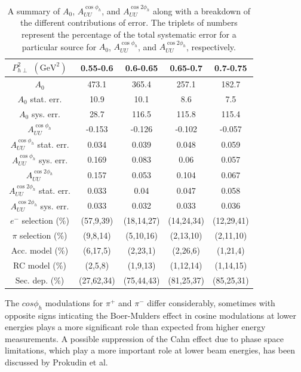 \documentclass[aps,prl,twocolumn,showpacs,superscriptaddress,groupedaddress]{revtex4-1}  %
\begin{document}
%
%
\begin{table}
\begin{center}
\begin{tabular}{ |c||c|c|c|c| } 

  \hline
  $P_{h\perp}^2$ $(\text{GeV}^2)$ & 0.55-0.6 & 0.6-0.65 & 0.65-0.7 & 0.7-0.75 \\
  \hline
  \hline
  $A_0$ & 473.1 & 365.4 & 257.1 & 182.7 \\
  \hline
  $A_0$ stat. err. & 10.9 & 10.1 & 8.6 & 7.5 \\
  \hline
  $A_0$ sys. err. & 28.7 & 116.5 & 115.8 & 115.4 \\
  \hline
  $A_{UU}^{\cos \phi_h}$ & -0.153 & -0.126 & -0.102 & -0.057 \\
  \hline
  $A_{UU}^{\cos \phi_h}$ stat. err. & 0.034 & 0.039 & 0.048 & 0.059 \\
  \hline
  $A_{UU}^{\cos \phi_h}$ sys. err. & 0.169 & 0.083 & 0.06 & 0.057 \\
  \hline
  $A_{UU}^{\cos 2 \phi_h}$ & 0.157 & 0.053 & 0.104 & 0.067 \\
  \hline
  $A_{UU}^{\cos 2 \phi_h}$ stat. err. & 0.033 & 0.04 & 0.047 & 0.058 \\
  \hline
  $A_{UU}^{\cos 2 \phi_h}$ sys. err. & 0.033 & 0.032 & 0.033 & 0.036 \\
  \hline
  $e^-$ selection (\%) & (57,9,39) & (18,14,27) & (14,24,34) & (12,29,41) \\
  \hline
  $\pi$ selection (\%) & (9,8,14) & (5,10,16) & (2,13,10) & (2,11,10) \\
  \hline
  Acc. model (\%) & (6,17,5) & (2,23,1) & (2,26,6) & (1,21,4) \\
  \hline
  RC model (\%) & (2,5,8) & (1,9,13) & (1,12,14) & (1,14,15) \\
  \hline
  Sec. dep. (\%) & (27,62,34) & (75,44,43) & (81,25,37) & (85,25,31) \\
  \hline

\end{tabular}
\end{center}
\caption{A summary of $A_0$, $A_{UU}^{\cos \phi_h}$, and $A_{UU}^{\cos 2 \phi_h}$ along with a breakdown of the different contributions of error. The triplets of numbers represent the percentage of the total systematic error for a particular source for $A_0$, $A_{UU}^{\cos \phi_h}$, and $A_{UU}^{\cos 2 \phi_h}$, respectively.}
\label{tab:A0AcAcc_PT2bins_x1QQ1z8}
\end{table}

The $cos \phi_h$ modulations for $\pi^+$ and $\pi^-$ differ considerably, sometimes with opposite signs inticating the Boer-Mulders effect in cosine modulations at lower energies plays a more significant role than expected from higher energy measurements.
A possible suppression of the Cahn effect due to phase space limitations, which play a more important role at lower beam energies, has been discussed by Prokudin et al.
\end{document}
